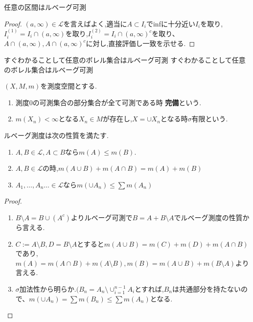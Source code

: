 \begin{lem}
 任意の区間はルベーグ可測
\end{lem}
\begin{proof}
  $(a, \infty) \in \mathcal{L}$を言えばよく,適当に$A \subset I_i$でinfに十分近い$I_i$を取り,$I_i^{(1)}= I_i \cap (a, \infty)$を取り,$I_i^{(2)}= I_i \cap (a, \infty)^c$を取り、
  $A \cap (a, \infty) ,A \cap (a, \infty)^c$に対し,直接評価し一致を示せる.
\end{proof}

すぐわかることして任意のボレル集合はルベーグ可測
すぐわかることして任意のボレル集合はルベーグ可測


\begin{screen}
\begin{dfn}
 $(X, M, m)$を測度空間とする.
 \begin{enumerate}
   \item  測度0の可測集合の部分集合が全て可測である時 \textbf{完備}という.
   \item $m(X_n) < \infty$となる$X_n \in M$が存在し,$X = \cup X_n$となる時$\sigma$有限という.
 \end{enumerate}
\end{dfn}
\end{screen}

\begin{prop}
ルベーグ測度は次の性質を満たす.
\begin{enumerate}
    \item $A, B \in \mathcal{L}, A \subset B$なら$m(A) \le m(B)$.
    \item $A, B \in \mathcal{L}$の時,$m(A \cup B) + m(A \cap B) = m(A) + m(B)$
    \item $A_1, \ldots, A_n \ldots \in \mathcal{L}$なら$m(\cup A_n) \le \sum m(A_n)$
\end{enumerate}
\end{prop}
\begin{proof}
\begin{enumerate}
    \item $B \setminus A = B \cup (A^c)$よりルベーグ可測で$B = A + B \setminus A$でルベーグ測度の性質から言える.
    \item $C:=A \setminus B, D = B \setminus A$とすると$m(A\cup B) = m(C) + m(D) + m(A\cap B)$であり,$m(A)= m(A\cap B) + m(A\setminus B), m(B)=m(A \cup B) + m(B \setminus A)$より言える.
    \item $\sigma$加法性から明らか.$(B_n = A_n \setminus \cup_{i=1}^{n-1} A_{i}$とすれば,$B_n$は共通部分を持たないので、$m(\cup A_n) = \sum m(B_n) \le \sum m(A_n)$となる.
\end{enumerate}
\end{proof}

